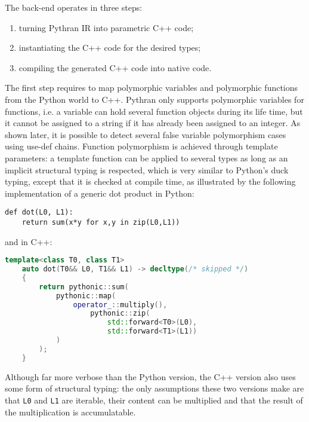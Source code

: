 \documentclass[10pt, onecolumn, preprint]{sigplanconf}
\begin{document}
The back-end operates in three steps:

\begin{enumerate}

    \item turning Pythran IR into parametric C++ code;

    \item instantiating the C++ code for the desired types;

    \item compiling the generated C++ code into native code.

\end{enumerate}

The first step requires to map polymorphic variables and polymorphic functions
from the Python world to C++. Pythran only supports polymorphic variables for
functions, i.e. a variable can hold several function objects during its life
time, but it cannot be assigned to a string if it has already been assigned to
an integer. %
As shown later, it is possible to detect several false variable
polymorphism cases using use-def chains. Function polymorphism is achieved
through template parameters: a template function can be applied to several
types as long as an implicit structural typing is respected, which is very
similar to Python's duck typing, except that it is checked at compile time, as
illustrated by the following implementation of a generic dot product in Python:

\begin{lstlisting}
def dot(L0, L1):
    return sum(x*y for x,y in zip(L0,L1))
\end{lstlisting}

\noindent and in C++:

\begin{lstlisting}[language=c++]
template<class T0, class T1>
    auto dot(T0&& L0, T1&& L1) -> decltype(/* skipped */)
    {
        return pythonic::sum(
            pythonic::map(
                operator_::multiply(),
                    pythonic::zip(
                        std::forward<T0>(L0),
                        std::forward<T1>(L1))
            )
        );
    }
\end{lstlisting}

Although far more verbose %
than the Python version, the C++ version also uses some
form of structural typing: the only assumptions these two versions make are that
\texttt{L0} and \texttt{L1} are iterable, their content can be multiplied and 
that the result of the multiplication is accumulatable.
\end{document}
